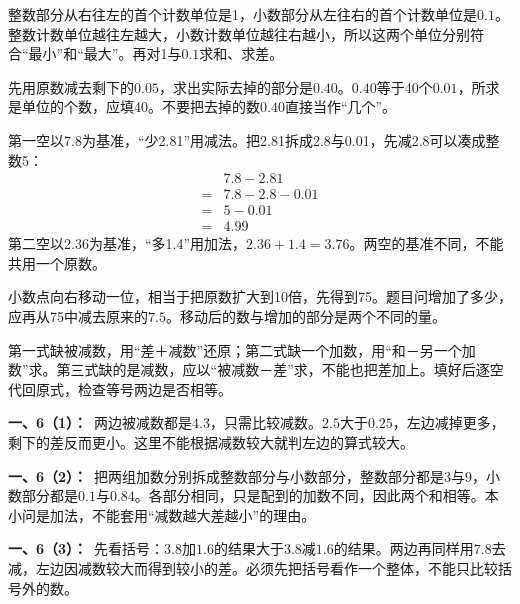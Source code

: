 \documentclass[multi=snippet,border=0pt]{standalone}
\newenvironment{snippet}[3]{\begin{minipage}{#1bp}\color{answerred}\fontsize{#2}{#3}\selectfont\raggedright}{\end{minipage}}
\begin{document}
\begin{snippet}{505}{11.5}{14}整数部分从右往左的首个计数单位是1，小数部分从左往右的首个计数单位是\(0.1\)。整数计数单位越往左越大，小数计数单位越往右越小，所以这两个单位分别符合“最小”和“最大”。再对1与\(0.1\)求和、求差。\end{snippet}
\begin{snippet}{505}{11.5}{14}先用原数减去剩下的\(0.05\)，求出实际去掉的部分是\(0.40\)。\(0.40\)等于40个\(0.01\)，所求是单位的个数，应填40。不要把去掉的数\(0.40\)直接当作“几个”。\end{snippet}
\begin{snippet}{505}{11.5}{14}第一空以7.8为基准，“少2.81”用减法。把2.81拆成2.8与0.01，先减2.8可以凑成整数5：\[\begin{aligned}&7.8-2.81\\={}&7.8-2.8-0.01\\={}&5-0.01\\={}&4.99\end{aligned}\]第二空以2.36为基准，“多1.4”用加法，\(2.36+1.4=3.76\)。两空的基准不同，不能共用一个原数。\end{snippet}
\begin{snippet}{505}{11.5}{14}小数点向右移动一位，相当于把原数扩大到10倍，先得到75。题目问增加了多少，应再从75中减去原来的\(7.5\)。移动后的数与增加的部分是两个不同的量。\end{snippet}
\begin{snippet}{505}{11.5}{14}第一式缺被减数，用“差＋减数”还原；第二式缺一个加数，用“和－另一个加数”求。第三式缺的是减数，应以“被减数－差”求，不能也把差加上。填好后逐空代回原式，检查等号两边是否相等。\end{snippet}
\begin{snippet}{505}{11.5}{14}\textbf{一、6（1）：}\ 两边被减数都是\(4.3\)，只需比较减数。\(2.5\)大于\(0.25\)，左边减掉更多，剩下的差反而更小。这里不能根据减数较大就判左边的算式较大。\end{snippet}
\begin{snippet}{505}{11.5}{14}\textbf{一、6（2）：}\ 把两组加数分别拆成整数部分与小数部分，整数部分都是3与9，小数部分都是\(0.1\)与\(0.84\)。各部分相同，只是配到的加数不同，因此两个和相等。本小问是加法，不能套用“减数越大差越小”的理由。\end{snippet}
\begin{snippet}{505}{11.5}{14}\textbf{一、6（3）：}\ 先看括号：\(3.8\)加\(1.6\)的结果大于\(3.8\)减\(1.6\)的结果。两边再同样用\(7.8\)去减，左边因减数较大而得到较小的差。必须先把括号看作一个整体，不能只比较括号外的数。\end{snippet}
\end{document}
